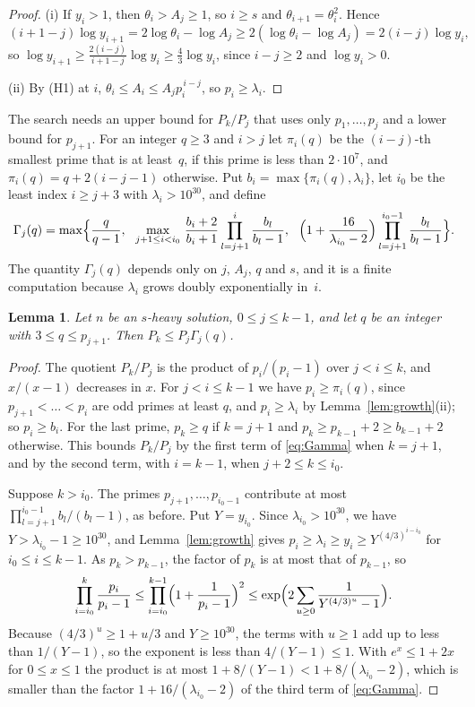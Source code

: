 \documentclass[screen,reqno]{aomart}
\numberwithin{equation}{section}
\theoremstyle{plain}
\newtheorem{lemma}[theorem]{Lemma}
\theoremstyle{definition}
\theoremstyle{remark}
\begin{document}
\begin{proof}
(i) If $y_i>1$, then $\theta_i>A_j\ge1$, so $i\ge s$ and
$\theta_{i+1}=\theta_i^2$. Hence
\[
  (i+1-j)\log y_{i+1}=2\log\theta_i-\log A_j
  \ge2(\log\theta_i-\log A_j)=2(i-j)\log y_i ,
\]
so $\log y_{i+1}\ge\frac{2(i-j)}{i+1-j}\log y_i\ge\frac43\log y_i$,
since $i-j\ge2$ and $\log y_i>0$.

(ii) By (H1) at $i$, $\theta_i\le A_i\le A_jp_i^{\,i-j}$, so
$p_i\ge\lambda_i$.
\end{proof}

The search needs an upper bound for $P_k/P_j$ that uses only
$p_1,\dots,p_j$ and a lower bound for $p_{j+1}$. For an integer
$q\ge3$ and $i>j$ let $\pi_i(q)$ be the $(i-j)$-th smallest prime that
is at least~$q$, if this prime is less than $2\cdot10^7$, and
$\pi_i(q)=q+2(i-j-1)$ otherwise. Put
$b_i=\max\{\pi_i(q),\lambda_i\}$, let $i_0$ be the least index
$i\ge j+3$ with $\lambda_i>10^{30}$, and define
\begin{equation}\label{eq:Gamma}
  \Gamma_j(q)=\max\Bigl\{\frac{q}{q-1},\ \
  \max_{j+1\le i<i_0}\,\frac{b_i+2}{b_i+1}\prod_{l=j+1}^{i}
  \frac{b_l}{b_l-1},\ \
  \Bigl(1+\frac{16}{\lambda_{i_0}-2}\Bigr)\prod_{l=j+1}^{i_0-1}
  \frac{b_l}{b_l-1}\Bigr\}.
\end{equation}
The quantity $\Gamma_j(q)$ depends only on $j$, $A_j$, $q$ and $s$,
and it is a finite computation because $\lambda_i$ grows doubly
exponentially in~$i$.

\begin{lemma}\label{lem:ext}
Let $n$ be an $s$-heavy solution, $0\le j\le k-1$, and let $q$ be an
integer with $3\le q\le p_{j+1}$. Then $P_k\le P_j\Gamma_j(q)$.
\end{lemma}

\begin{proof}
The quotient $P_k/P_j$ is the product of $p_i/(p_i-1)$ over
$j<i\le k$, and $x/(x-1)$ decreases in $x$. For $j<i\le k-1$ we have
$p_i\ge\pi_i(q)$, since $p_{j+1}<\dots<p_i$ are odd primes at least
$q$, and $p_i\ge\lambda_i$ by Lemma~\ref{lem:growth}(ii); so
$p_i\ge b_i$. For the last prime, $p_k\ge q$ if $k=j+1$ and
$p_k\ge p_{k-1}+2\ge b_{k-1}+2$ otherwise. This bounds $P_k/P_j$ by
the first term of \eqref{eq:Gamma} when $k=j+1$, and by the second
term, with $i=k-1$, when $j+2\le k\le i_0$.

Suppose $k>i_0$. The primes $p_{j+1},\dots,p_{i_0-1}$ contribute at
most $\prod_{l=j+1}^{i_0-1}b_l/(b_l-1)$, as before. Put $Y=y_{i_0}$.
Since $\lambda_{i_0}>10^{30}$, we have $Y>\lambda_{i_0}-1\ge10^{30}$,
and Lemma~\ref{lem:growth} gives
$p_i\ge\lambda_i\ge y_i\ge Y^{(4/3)^{i-i_0}}$ for $i_0\le i\le k-1$.
As $p_k>p_{k-1}$, the factor of $p_k$ is at most that of $p_{k-1}$,
so
\[
  \prod_{i=i_0}^{k}\frac{p_i}{p_i-1}
  \le\prod_{i=i_0}^{k-1}\Bigl(1+\frac1{p_i-1}\Bigr)^{2}
  \le\exp\Bigl(2\sum_{u\ge0}\frac1{Y^{(4/3)^u}-1}\Bigr).
\]
Because $(4/3)^u\ge1+u/3$ and $Y\ge10^{30}$, the terms with $u\ge1$
add up to less than $1/(Y-1)$, so the exponent is less than
$4/(Y-1)\le1$. With $e^x\le1+2x$ for $0\le x\le1$ the product is at
most $1+8/(Y-1)<1+8/(\lambda_{i_0}-2)$, which is smaller than the
factor $1+16/(\lambda_{i_0}-2)$ of the third term of \eqref{eq:Gamma}.
\end{proof}
\end{document}
